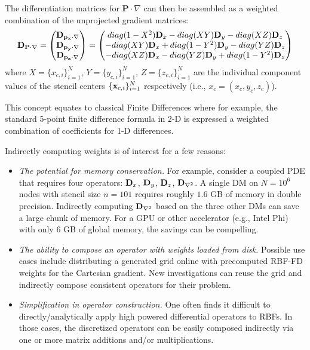 The differentiation matrices for $\mathbf{P} \cdot \nabla$ can then be assembled as a weighted combination of the unprojected gradient matrices: 
\begin{equation}
\mathbf{D}_{\mathbf{P} \cdot \nabla} = \begin{pmatrix} \mathbf{D}_{\mathbf{p_{x} \cdot \nabla}} \\  \mathbf{D}_{\mathbf{p_{y}\cdot \nabla}} \\  \mathbf{D}_{\mathbf{p_{z}\cdot \nabla}} \end{pmatrix} = \begin{pmatrix} 
diag(1-X^{2}) \mathbf{D}_{x} - diag(XY) \mathbf{D}_{y} - diag(XZ) \mathbf{D}_{z} \\
- diag(XY)\mathbf{D}_{x} + diag(1-Y^{2}) \mathbf{D}_{y} - diag(YZ) \mathbf{D}_{z} \\
- diag(XZ)\mathbf{D}_{x} - diag(YZ) \mathbf{D}_{y} + diag(1-Y^{2}) \mathbf{D}_{z} 
\end{pmatrix}
\label{eq:indirect_project}
\end{equation}
 where $X = \{x_{c,i}\}_{i=1}^{N}$, $Y = \{y_{c,i}\}_{i=1}^{N}$, $Z = \{z_{c,i}\}_{i=1}^{N}$ are the individual component values of the stencil centers $\{\mathbf{x}_{c,i}\}_{i=1}^{N}$ respectively (i.e., $x_c = (x_c, y_c, z_c)$). 

This concept equates to classical Finite Differences where for example, the standard 5-point finite difference formula in 2-D is expressed a weighted combination of coefficients for 1-D differences. 

Indirectly computing weights is of interest for a few reasons: 
\begin{itemize}
\item \emph{The potential for memory conservation.} For example, consider a coupled PDE that requires four operators: $\mathbf{D}_x$, $\mathbf{D}_y$, $\mathbf{D}_z$, $\mathbf{D}_{\nabla^2}$. A single DM on $N=10^6$ nodes with stencil size $n=101$ requires roughly $1.6$ GB of memory in double precision. Indirectly computing $\mathbf{D}_{\nabla^2}$ based on the three other DMs can save a large chunk of memory. For a GPU or other accelerator (e.g., Intel Phi) with only 6 GB of global memory, the savings can be compelling.
\item \emph{The ability to compose an operator with weights loaded from disk.} Possible use cases include distributing a generated grid online with precomputed RBF-FD weights for the Cartesian gradient. New investigations can reuse the grid and indirectly compose consistent operators for their problem.
\item \emph{Simplification in operator construction.} One often finds it difficult to directly/analytically apply high powered differential operators to RBFs. In those cases, the discretized operators can be easily composed indirectly via one or more matrix additions and/or multiplications. 
\end{itemize}


